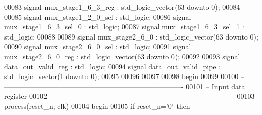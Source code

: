 \begin{DoxyCode}
00083 \textcolor{keywordflow}{signal} \textcolor{vhdlchar}{mux_stage1_6_3_reg}       \textcolor{vhdlchar}{:} \textcolor{comment}{std\_logic\_vector}\textcolor{vhdlchar}{(}\textcolor{vhdllogic}{}\textcolor{vhdllogic}{63} \textcolor{keywordflow}{downto} \textcolor{vhdllogic}{}\textcolor{vhdllogic}{0}\textcolor{vhdlchar}{)};
00084 
00085 \textcolor{keywordflow}{signal} \textcolor{vhdlchar}{mux_stage1_2_0_sel}      \textcolor{vhdlchar}{:} \textcolor{comment}{std\_logic};
00086 \textcolor{keywordflow}{signal} \textcolor{vhdlchar}{mux_stage1_6_3_sel_0} \textcolor{vhdlchar}{:} \textcolor{comment}{std\_logic};
00087 \textcolor{keywordflow}{signal} \textcolor{vhdlchar}{mux_stage1_6_3_sel_1} \textcolor{vhdlchar}{:} \textcolor{comment}{std\_logic};
00088 
00089 \textcolor{keywordflow}{signal} \textcolor{vhdlchar}{mux_stage2_6_0}       \textcolor{vhdlchar}{:} \textcolor{comment}{std\_logic\_vector}\textcolor{vhdlchar}{(}\textcolor{vhdllogic}{}\textcolor{vhdllogic}{63} \textcolor{keywordflow}{downto} \textcolor{vhdllogic}{}\textcolor{vhdllogic}{0}\textcolor{vhdlchar}{)};
00090 \textcolor{keywordflow}{signal} \textcolor{vhdlchar}{mux_stage2_6_0_sel}       \textcolor{vhdlchar}{:} \textcolor{comment}{std\_logic};
00091 \textcolor{keywordflow}{signal} \textcolor{vhdlchar}{mux_stage2_6_0_reg}       \textcolor{vhdlchar}{:} \textcolor{comment}{std\_logic\_vector}\textcolor{vhdlchar}{(}\textcolor{vhdllogic}{}\textcolor{vhdllogic}{63} \textcolor{keywordflow}{downto} \textcolor{vhdllogic}{}\textcolor{vhdllogic}{0}\textcolor{vhdlchar}{)};
00092 
00093 \textcolor{keywordflow}{signal} \textcolor{vhdlchar}{data_out_valid_reg}   \textcolor{vhdlchar}{:} \textcolor{comment}{std\_logic};
00094 \textcolor{keywordflow}{signal} \textcolor{vhdlchar}{data_out_valid_pipe}  \textcolor{vhdlchar}{:} \textcolor{comment}{std\_logic\_vector}\textcolor{vhdlchar}{(}\textcolor{vhdllogic}{}\textcolor{vhdllogic}{1} \textcolor{keywordflow}{downto} \textcolor{vhdllogic}{}\textcolor{vhdllogic}{0}\textcolor{vhdlchar}{)};
00095 
00096 
00097  
00098 \textcolor{vhdlkeyword}{begin}
00099 
00100 \textcolor{keyword}{-- ----------------------------------------------------------------------------}
00101 \textcolor{keyword}{-- Input data register}
00102 \textcolor{keyword}{-- ----------------------------------------------------------------------------}
00103   \textcolor{keywordflow}{process}(reset_n, clk)
00104 \textcolor{vhdlkeyword}{    begin}
00105       \textcolor{keywordflow}{if} \textcolor{vhdlchar}{reset_n}\textcolor{vhdlchar}{=}\textcolor{vhdlchar}{'}\textcolor{vhdllogic}{}\textcolor{vhdllogic}{0}\textcolor{vhdlchar}{'} \textcolor{keywordflow}{then}

\end{DoxyCode}
